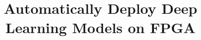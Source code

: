 \documentclass{acm_proc_article-sp-copy}
\begin{document}
	
\title{Automatically Deploy Deep Learning Models on FPGA}

%
%
%
%
%

%
\end{document}
